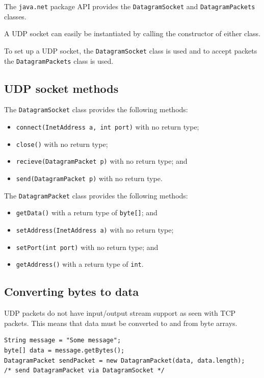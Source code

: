 \documentclass[a4paper]{systems-software}
\begin{document}
The \texttt{java.net} package API provides the \texttt{DatagramSocket} and \texttt{DatagramPackets} classes.

A UDP socket can easily be instantiated by calling the constructor of either class.

To set up a UDP socket, the \texttt{DatagramSocket} class is used and to accept packets the \texttt{DatagramPackets} class is used.


\subsection*{UDP socket methods}

The \texttt{DatagramSocket} class provides the following methods:
\begin{itemize}
	\item \texttt{connect(InetAddress a, int port)} with no return type;
	\item \texttt{close()} with no return type;
	\item \texttt{recieve(DatagramPacket p)} with no return type; and
	\item \texttt{send(DatagramPacket p)} with no return type.
\end{itemize}

The \texttt{DatagramPacket} class provides the following methods:
\begin{itemize}
	\item \texttt{getData()} with a return type of \texttt{byte[]}; and
	\item \texttt{setAddress(InetAddress a)} with no return type;
	\item \texttt{setPort(int port)} with no return type; and
	\item \texttt{getAddress()} with a return type of \texttt{int}.
\end{itemize}


\subsection*{Converting bytes to data}

UDP packets do not have input/output stream support as seen with TCP packets. This means that data must be converted to and from byte arrays.

\begin{lstlisting}[title={Client: sending a DatagramPacket.}]
String message = "Some message";
byte[] data = message.getBytes();
DatagramPacket sendPacket = new DatagramPacket(data, data.length);
/* send DatagramPacket via DatagramSocket */
\end{lstlisting}
\end{document}
